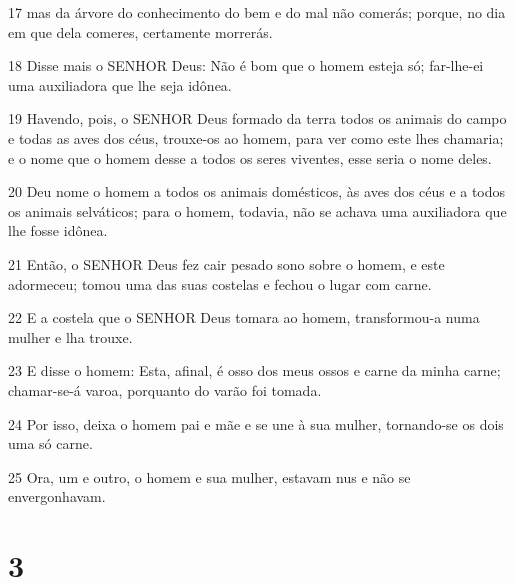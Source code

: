 \par 17 mas da árvore do conhecimento do bem e do mal não comerás; porque, no dia em que dela comeres, certamente morrerás.
\par 18 Disse mais o SENHOR Deus: Não é bom que o homem esteja só; far-lhe-ei uma auxiliadora que lhe seja idônea.
\par 19 Havendo, pois, o SENHOR Deus formado da terra todos os animais do campo e todas as aves dos céus, trouxe-os ao homem, para ver como este lhes chamaria; e o nome que o homem desse a todos os seres viventes, esse seria o nome deles.
\par 20 Deu nome o homem a todos os animais domésticos, às aves dos céus e a todos os animais selváticos; para o homem, todavia, não se achava uma auxiliadora que lhe fosse idônea.
\par 21 Então, o SENHOR Deus fez cair pesado sono sobre o homem, e este adormeceu; tomou uma das suas costelas e fechou o lugar com carne.
\par 22 E a costela que o SENHOR Deus tomara ao homem, transformou-a numa mulher e lha trouxe.
\par 23 E disse o homem: Esta, afinal, é osso dos meus ossos e carne da minha carne; chamar-se-á varoa, porquanto do varão foi tomada.
\par 24 Por isso, deixa o homem pai e mãe e se une à sua mulher, tornando-se os dois uma só carne.
\par 25 Ora, um e outro, o homem e sua mulher, estavam nus e não se envergonhavam.

\chapter{3}

